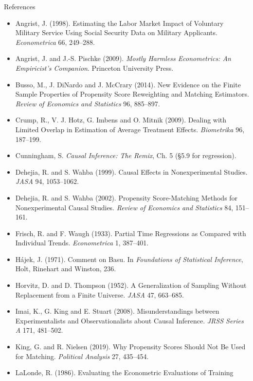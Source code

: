 \documentclass[
  11pt,
  ignorenonframetext,
  aspectratio=169,
]{beamer}
\providecommand{\tightlist}{%
  \setlength{\itemsep}{0pt}\setlength{\parskip}{0pt}}
\begin{document}
\begin{frame}{References}
\protect{}\label{references}
\tiny

\begin{itemize}
\tightlist
\item
  Angrist, J. (1998). Estimating the Labor Market Impact of Voluntary
  Military Service Using Social Security Data on Military Applicants.
  \emph{Econometrica} 66, 249--288.
\item
  Angrist, J. and J.-S. Pischke (2009). \emph{Mostly Harmless
  Econometrics: An Empiricist's Companion}. Princeton University Press.
\item
  Busso, M., J. DiNardo and J. McCrary (2014). New Evidence on the
  Finite Sample Properties of Propensity Score Reweighting and Matching
  Estimators. \emph{Review of Economics and Statistics} 96, 885--897.
\item
  Crump, R., V. J. Hotz, G. Imbens and O. Mitnik (2009). Dealing with
  Limited Overlap in Estimation of Average Treatment Effects.
  \emph{Biometrika} 96, 187--199.
\item
  Cunningham, S. \emph{Causal Inference: The Remix}, Ch. 5 (§5.9 for
  regression).
\item
  Dehejia, R. and S. Wahba (1999). Causal Effects in Nonexperimental
  Studies. \emph{JASA} 94, 1053--1062.
\item
  Dehejia, R. and S. Wahba (2002). Propensity Score-Matching Methods for
  Nonexperimental Causal Studies. \emph{Review of Economics and
  Statistics} 84, 151--161.
\item
  Frisch, R. and F. Waugh (1933). Partial Time Regressions as Compared
  with Individual Trends. \emph{Econometrica} 1, 387--401.
\item
  Hájek, J. (1971). Comment on Basu. In \emph{Foundations of Statistical
  Inference}, Holt, Rinehart and Winston, 236.
\item
  Horvitz, D. and D. Thompson (1952). A Generalization of Sampling
  Without Replacement from a Finite Universe. \emph{JASA} 47, 663--685.
\item
  Imai, K., G. King and E. Stuart (2008). Misunderstandings between
  Experimentalists and Observationalists about Causal Inference.
  \emph{JRSS Series A} 171, 481--502.
\item
  King, G. and R. Nielsen (2019). Why Propensity Scores Should Not Be
  Used for Matching. \emph{Political Analysis} 27, 435--454.
\item
  LaLonde, R. (1986). Evaluating the Econometric Evaluations of Training

\end{itemize}
\end{frame}
\end{document}
